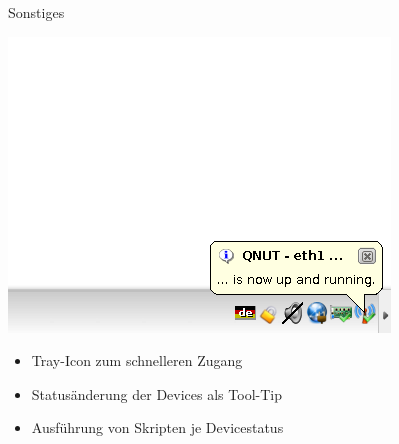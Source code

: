 \begin{frame}[<+-| alert@+>]{Sonstiges}

	\includegraphics[scale=0.25]{qnut_tooltip.png}
	
	\begin{itemize}
		\item Tray-Icon zum schnelleren Zugang
		\item Statusänderung der Devices als Tool-Tip
		\item Ausführung von Skripten je Devicestatus
	\end{itemize}
\end{frame}



